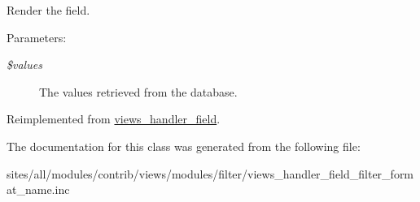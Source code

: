 Render the field.

\begin{Desc}
\item[Parameters:]
\begin{description}
\item[{\em \$values}]The values retrieved from the database. \end{description}
\end{Desc}


Reimplemented from \hyperlink{classviews__handler__field_82ff951c5e9ceb97b2eab86f880cbc1e}{views\_\-handler\_\-field}.

The documentation for this class was generated from the following file:\begin{CompactItemize}
\item 
sites/all/modules/contrib/views/modules/filter/views\_\-handler\_\-field\_\-filter\_\-format\_\-name.inc\end{CompactItemize}
